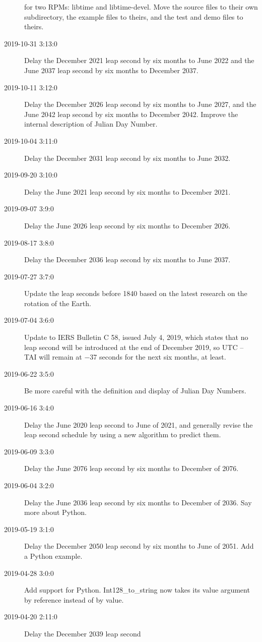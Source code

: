 \documentclass[letterpaper,twoside]{article}
\begin{document}
\begin{description}
  for two RPMs: libtime and libtime-devel.  Move the source
  files to their own subdirectory, the example files to theirs,
  and the test and demo files to theirs.
\item[2019-10-31 3:13:0]Delay the December 2021 leap second by
  six months to June 2022 and the June 2037 leap second by six
  months to December 2037.
\item[2019-10-11 3:12:0]Delay the December 2026 leap second by
  six months to June 2027, and the June 2042 leap second by six
  months to December 2042.  Improve the internal description of
  Julian Day Number.
\item[2019-10-04 3:11:0]Delay the December 2031 leap second by
  six months to June 2032.
\item[2019-09-20 3:10:0]Delay the June 2021 leap second by six
  months to December 2021.
\item[2019-09-07 3:9:0]Delay the June 2026 leap second by six months
  to December 2026.
\item[2019-08-17 3:8:0]Delay the December 2036 leap second by six
  months to June 2037.
\item[2019-07-27 3:7:0]Update the leap seconds before 1840 based
  on the latest research on the rotation of the Earth.
\item[2019-07-04 3:6:0]Update to IERS Bulletin C 58, issued July
  4, 2019, which states that no leap second will be introduced
  at the end of December 2019, so UTC -- TAI will remain at
  \num{-37} seconds for the next six months, at least.  
\item[2019-06-22 3:5:0] Be more careful with the definition
  and display of Julian Day Numbers.
\item[2019-06-16 3:4:0] Delay the June 2020 leap second to
  June of 2021, and generally revise the leap second schedule
  by using a new algorithm to predict them.
\item[2019-06-09 3:3:0] Delay the June 2076 leap second by
  six months to December of 2076.
\item[2019-06-04 3:2:0] Delay the June 2036 leap second by
  six months to December of 2036.  Say more about Python.
\item[2019-05-19 3:1:0] Delay the December 2050 leap second
  by six months to June of 2051.  Add a Python example.
\item[2019-04-28 3:0:0] Add support for Python.  Int128\_to\_string
  now takes its value argument by reference instead of by value.
\item[2019-04-20 2:11:0] Delay the December 2039 leap second

\end{description}
\end{document}
